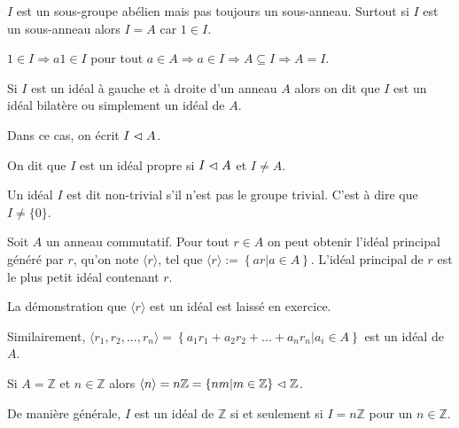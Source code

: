 \begin{rmrk}
$I$ est un sous-groupe abélien mais pas toujours un sous-anneau. Surtout si $I$ est un sous-anneau alors $I=A$ car $1\in I$.

$1\in I\Longrightarrow a1\in I$ pour tout $a\in A\Longrightarrow a\in I \Longrightarrow A\subseteq I\Longrightarrow A=I$.
\end{rmrk}

\begin{defn}
Si $I$ est un idéal à gauche et à droite d'un anneau $A$ alors on dit que $I$ est un idéal bilatère ou simplement un idéal de $A$.

Dans ce cas, on écrit $I\vartriangleleft A$.
\end{defn}

\begin{defn}
On dit que $I$ est un idéal propre si $I\vartriangleleft A$ et $I\neq A$.
\end{defn}

\begin{defn}
Un idéal $I$ est dit non-trivial s'il n'est  pas le groupe trivial. C'est à dire que $I\neq\{0\}$.
\end{defn}

\begin{ex}
Soit $A$ un anneau commutatif. Pour tout $r\in A$ on peut obtenir l'idéal principal généré par $r$, qu'on note $\langle r\rangle$, tel que $\langle r\rangle:=\left\{ ar | a\in A\right\}$. L'idéal principal de $r$ est le plus petit idéal contenant $r$.

La démonstration que $\langle r\rangle$ est un idéal est laissé en exercice.

Similairement, $\langle r_1,r_2,...,r_n\rangle=\left\{ a_1r_1+a_2r_2+...+a_nr_n | a_i\in A\right\}$ est un idéal de $A$.
\end{ex}

\begin{ex}
Si $A=\mathbb{Z}$ et $n\in\mathbb{Z}$ alors $\langle n\rangle=n\mathbb{Z}=\left\{nm | m\in\mathbb{Z}\right\}\vartriangleleft\mathbb{Z}$.

De manière générale, $I$ est un idéal de $\mathbb{Z}$ si et seulement si $I=n\mathbb{Z}$ pour un $n\in\mathbb{Z}$.
\end{ex}

